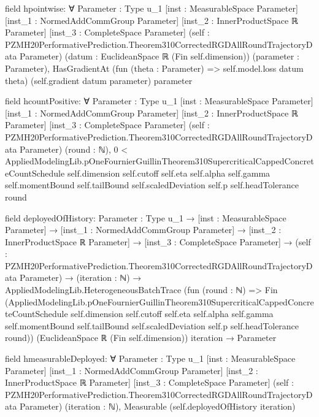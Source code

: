 \documentclass[10pt]{article}
\begin{document}
\begin{ReviewVerbatim}
field hpointwise:
∀ {Parameter : Type u_1} [inst : MeasurableSpace Parameter] [inst_1 : NormedAddCommGroup Parameter]
  [inst_2 : InnerProductSpace ℝ Parameter] [inst_3 : CompleteSpace Parameter]
  (self : PZMH20PerformativePrediction.Theorem310CorrectedRGDAllRoundTrajectoryData Parameter)
  (datum : EuclideanSpace ℝ (Fin self.dimension)) (parameter : Parameter),
  HasGradientAt (fun (theta : Parameter) => self.model.loss datum theta) (self.gradient datum parameter) parameter

field hcountPositive:
∀ {Parameter : Type u_1} [inst : MeasurableSpace Parameter] [inst_1 : NormedAddCommGroup Parameter]
  [inst_2 : InnerProductSpace ℝ Parameter] [inst_3 : CompleteSpace Parameter]
  (self : PZMH20PerformativePrediction.Theorem310CorrectedRGDAllRoundTrajectoryData Parameter) (round : ℕ),
  0 <
    AppliedModelingLib.pOneFournierGuillinTheorem310SupercriticalCappedConcreteCountSchedule self.dimension self.cutoff
      self.eta self.alpha self.gamma self.momentBound self.tailBound self.scaledDeviation self.p self.headTolerance
      round

field deployedOfHistory:
{Parameter : Type u_1} →
  [inst : MeasurableSpace Parameter] →
    [inst_1 : NormedAddCommGroup Parameter] →
      [inst_2 : InnerProductSpace ℝ Parameter] →
        [inst_3 : CompleteSpace Parameter] →
          (self : PZMH20PerformativePrediction.Theorem310CorrectedRGDAllRoundTrajectoryData Parameter) →
            (iteration : ℕ) →
              AppliedModelingLib.HeterogeneousBatchTrace
                  (fun (round : ℕ) =>
                    Fin
                      (AppliedModelingLib.pOneFournierGuillinTheorem310SupercriticalCappedConcreteCountSchedule
                        self.dimension self.cutoff self.eta self.alpha self.gamma self.momentBound self.tailBound
                        self.scaledDeviation self.p self.headTolerance round))
                  (EuclideanSpace ℝ (Fin self.dimension)) iteration →
                Parameter

field hmeasurableDeployed:
∀ {Parameter : Type u_1} [inst : MeasurableSpace Parameter] [inst_1 : NormedAddCommGroup Parameter]
  [inst_2 : InnerProductSpace ℝ Parameter] [inst_3 : CompleteSpace Parameter]
  (self : PZMH20PerformativePrediction.Theorem310CorrectedRGDAllRoundTrajectoryData Parameter) (iteration : ℕ),
  Measurable (self.deployedOfHistory iteration)


\end{ReviewVerbatim}
\end{document}
